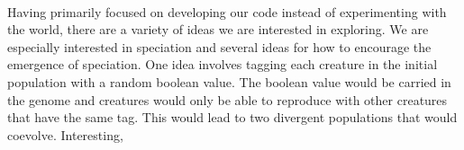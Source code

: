 \documentclass[12pt]{report}
\begin{document}
\paragraph{} Having primarily focused on developing our code instead of experimenting with the world, there are a variety of ideas we are interested in exploring. We are especially interested in speciation and several ideas for how to encourage the emergence of speciation. One idea involves tagging each creature in the initial population with a random boolean value. The boolean value would be carried in the genome and creatures would only be able to reproduce with other creatures that have the same tag. This would lead to two divergent populations that would coevolve. Interesting, 

{}

\end{document}
